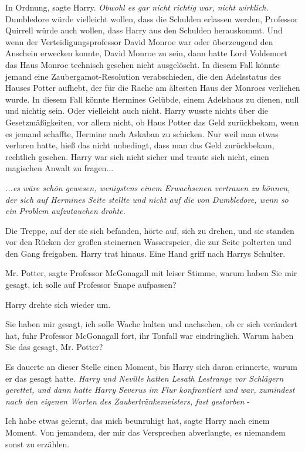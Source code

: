 \glqq{}In Ordnung\grqq{}, sagte Harry. \emph{Obwohl es gar nicht richtig war,
nicht wirklich.} Dumbledore würde vielleicht wollen, dass die Schulden erlassen
werden, Professor Quirrell würde auch wollen, dass Harry aus den Schulden
herauskommt. Und wenn der Verteidigungsprofessor David Monroe war oder
überzeugend den Anschein erwecken konnte, David Monroe zu sein, dann hatte Lord
Voldemort das Haus Monroe technisch gesehen nicht ausgelöscht. In diesem Fall
könnte jemand eine Zaubergamot-Resolution verabschieden, die den Adelsstatus des
Hauses Potter aufhebt, der für die Rache am ältesten Haus der Monroes verliehen
wurde. In diesem Fall könnte Hermines Gelübde, einem Adelshaus zu dienen, null
und nichtig sein. Oder vielleicht auch nicht. Harry wusste nichts über die
Gesetzmäßigkeiten, vor allem nicht, ob Haus Potter das Geld zurückbekam, wenn es
jemand schaffte, Hermine nach Askaban zu schicken. Nur weil man etwas verloren
hatte, hieß das nicht unbedingt, dass man das Geld zurückbekam, rechtlich
gesehen. Harry war sich nicht sicher und traute sich nicht, einen magischen
Anwalt zu fragen...

\emph{...es wäre schön gewesen, wenigstens einem Erwachsenen vertrauen zu
können, der sich auf Hermines Seite stellte und nicht auf die von Dumbledore,
wenn so ein Problem aufzutauchen drohte.}

Die Treppe, auf der sie sich befanden, hörte auf, sich zu drehen, und sie
standen vor den Rücken der großen steinernen Wasserspeier, die zur Seite
polterten und den Gang freigaben. Harry trat hinaus. Eine Hand griff nach Harrys
Schulter.

\glqq{}Mr. Potter\grqq{}, sagte Professor McGonagall mit leiser Stimme, \glqq{}
warum haben Sie mir gesagt, ich solle auf Professor Snape aufpassen?\grqq{}

Harry drehte sich wieder um.

\glqq{}Sie haben mir gesagt, ich solle Wache halten und nachsehen, ob er sich
verändert hat\grqq{}, fuhr Professor McGonagall fort, ihr Tonfall war
eindringlich. \glqq{}Warum haben Sie das gesagt, Mr. Potter?\grqq{}

Es dauerte an dieser Stelle einen Moment, bis Harry sich daran erinnerte, warum
er das gesagt hatte. \emph{Harry und Neville hatten Lesath Lestrange vor
Schlägern gerettet, und dann hatte Harry Severus im Flur konfrontiert und war,
zumindest nach den eigenen Worten des Zaubertränkemeisters, \glqq{}fast
gestorben\grqq{}} -

\glqq{}Ich habe etwas gelernt, das mich beunruhigt hat\grqq{}, sagte Harry nach
einem Moment. \glqq{}Von jemandem, der mir das Versprechen abverlangte, es
niemandem sonst zu erzählen.\grqq{}

